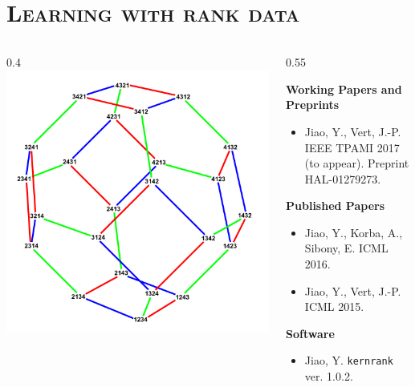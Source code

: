 \documentclass[xcolor=x11names,compress]{beamer}
\theoremstyle{plain}
\renewcommand{\(}{\begin{columns}}
\renewcommand{\)}{\end{columns}}
\newcommand{\<}[1]{\begin{column}{#1}}
\renewcommand{\>}{\end{column}}
\newcommand{\addsectiontitlepage}{
	\hfill\leavevmode
  \vtop{
    \huge\hbox{\color{myblue}\insertsection}
    \kern.5ex %
    \vspace{1cm}
  }
}
\begin{document}
\section{\scshape Learning with rank data}


\begin{frame}
	
	\addsectiontitlepage
	
	\(
	\<{0.4\linewidth}
	\includegraphics[width=\columnwidth]{ch-kendall/figures/permutahedron}
	\>
	
	\<{0.55\linewidth}
	\begin{footnotesize}
	\textbf{Working Papers and Preprints}
	\begin{itemize}
		\item \nocite{Jiao2017Kendall} Jiao, Y., Vert, J.-P. IEEE TPAMI 2017 (to appear). Preprint HAL-01279273.
	\end{itemize}
	
	\textbf{Published Papers}
	\begin{itemize}
		\item \nocite{Jiao2016Controlling} Jiao, Y., Korba, A., Sibony, E. ICML 2016.
		\item \nocite{Jiao2015Kendall} Jiao, Y., Vert, J.-P. ICML 2015.
	\end{itemize}
	
	\textbf{Software}
	\begin{itemize}
		\item \nocite{Jiao2016kernrank} Jiao, Y. \texttt{kernrank} ver. 1.0.2.
	\end{itemize}
	\end{footnotesize}
	\>
	\)
	
\end{frame}
\end{document}
